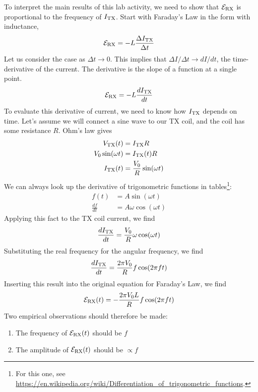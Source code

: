 \documentclass[12pt,twocolumn]{article}
\begin{document}
To interpret the main results of this lab activity, we need to show that $\mathcal{E}_{\rm RX}$ is proportional to the frequency of $I_{\rm TX}$.  Start with Faraday's Law in the form with inductance,
\begin{equation}
\mathcal{E}_{\rm RX} = - L\frac{\Delta I_{\rm TX}}{\Delta t}
\end{equation}
Let us consider the case as $\Delta t \to 0$.  This implies that $\Delta I/\Delta t \to dI/dt$, the time-derivative of the current.  The derivative is the slope of a function at a single point.
\begin{equation}
\mathcal{E}_{\rm RX} = - L\frac{dI_{\rm TX}}{dt}
\end{equation}
To evaluate this derivative of current, we need to know how $I_{\rm TX}$ depends on time.  Let's assume we will connect a sine wave to our TX coil, and the coil has some resistance $R$.  Ohm's law gives
\begin{align}
V_{\rm TX}(t) &= I_{\rm TX}R \\
V_0 \sin(\omega t) &= I_{\rm TX}(t) R \\
I_{\rm TX} (t) &= \frac{V_0}{R}\sin(\omega t)
\end{align}
We can always look up the derivative of trigonometric functions in tables\footnote{For this one, see \url{https://en.wikipedia.org/wiki/Differentiation_of_trigonometric_functions}.}:
\begin{align}
f(t) &= A\sin(\omega t) \\
\frac{df}{dt} &= A\omega \cos(\omega t)
\end{align}
Applying this fact to the TX coil current, we find
\begin{equation}
\frac{dI_{\rm TX}}{dt} = \frac{V_0}{R}\omega \cos(\omega t)
\end{equation}
Substituting the real frequency for the angular frequency, we find
\begin{equation}
\frac{dI_{\rm TX}}{dt} = \frac{2\pi V_0}{R} f\cos(2\pi f t)
\end{equation}
Inserting this result into the original equation for Faraday's Law, we find
\begin{equation}
\mathcal{E}_{\rm RX}(t) = -\frac{2\pi V_0 L}{R} f\cos(2\pi f t)
\end{equation}
Two empirical observations should therefore be made:
\begin{enumerate}
\item The frequency of $\mathcal{E}_{\rm RX}(t)$ should be $f$
\item The amplitude of $\mathcal{E_{\rm RX}}(t)$ should be $\propto f$
\end{enumerate}
\end{document}
